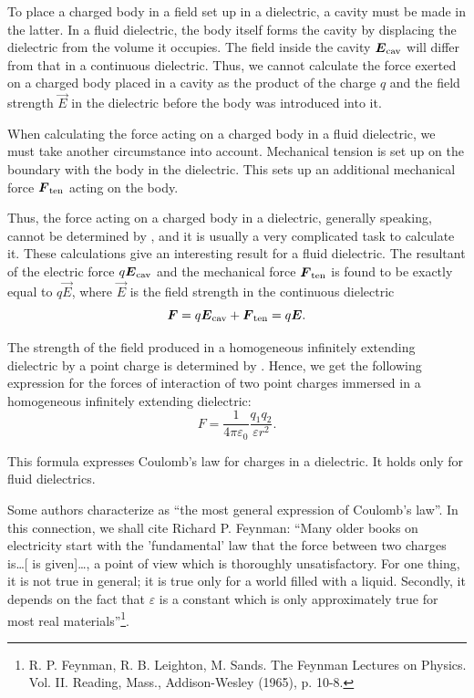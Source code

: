 \noindent
To place a charged body in a field set up in a dielectric, a cavity must be made in the latter. In a fluid dielectric, the body itself forms the cavity by displacing the dielectric from the volume it occupies. The field inside the cavity $\boldsymbol{E}_{\text{cav}}$ will differ from that in a continuous dielectric. Thus, we cannot calculate the force exerted on a charged body placed in a cavity as the product of the charge $q$ and the field strength $\vec{E}$ in the dielectric before the body was introduced into it.

When calculating the force acting on a charged body in a fluid dielectric, we must take another circumstance into account. Mechanical tension is set up on the boundary with the body in the dielectric. This sets up an additional mechanical force $\boldsymbol{F}_{\text{ten}}$ acting on the body.

Thus, the force acting on a charged body in a dielectric, generally speaking, cannot be determined by , and it is usually a very complicated task to calculate it. These calculations give an interesting result for a fluid dielectric. The resultant of the electric force $q\boldsymbol{E}_{\text{cav}}$ and the mechanical force $\boldsymbol{F}_{\text{ten}}$ is found to be exactly equal to $q\vec{E}$, where $\vec{E}$ is the field strength in the continuous dielectric
\begin{equation}\label{eq:2_51}
    \boldsymbol{F} = q\boldsymbol{E}_{\text{cav}} + \boldsymbol{F}_{\text{ten}} = q\boldsymbol{E}.
\end{equation}

The strength of the field produced in a homogeneous infinitely extending dielectric by a point charge is determined by . Hence, we get the following expression for the forces of interaction of two point charges immersed in a homogeneous infinitely extending dielectric:
\begin{equation}\label{eq:2_52}
    F = \frac{1}{4\pi\varepsilon_0} \frac{q_1q_2}{\varepsilon r^2}.
\end{equation}

\noindent
This formula expresses Coulomb's law for charges in a dielectric. It holds only for fluid dielectrics.

Some authors characterize  as ``the most general expression of Coulomb's law''. In this connection, we shall cite Richard P. Feynman: ``Many older books on electricity start with the 'fundamental' law that the force between two charges is\ldots [ is given]\ldots, a point of view which is thoroughly unsatisfactory. For one thing, it is not true in general; it is true only for a world filled with a liquid. Secondly, it depends on the fact that $\varepsilon$ is a constant which is only approximately true for most real materials''\footnote{R. P. Feynman, R. B. Leighton, M. Sands. The Feynman Lectures on Physics. Vol. II. Reading, Mass., Addison-Wesley (1965), p. 10-8.}.

